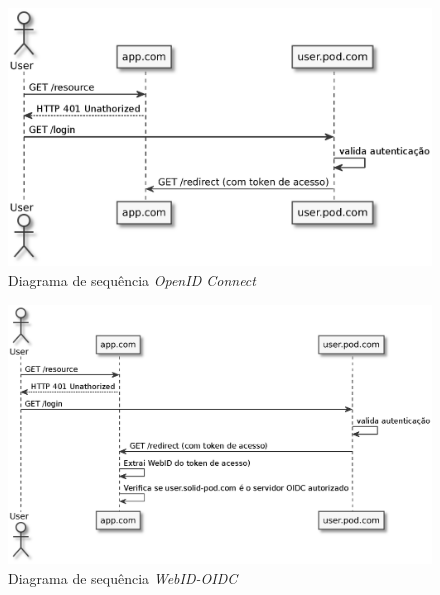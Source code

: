 \begin{figure}[H]
    \centering
    \includegraphics[width=0.9 \textwidth]{figures/open_id_connect_sd.eps}
    \caption{Diagrama de sequência \emph{OpenID Connect}}
    \label{open-id-connect-sequence-diagram}
\end{figure}

\begin{figure}[H]
    \centering
    \includegraphics[width=0.9 \textwidth]{figures/WebId-OIDC}
    \caption{Diagrama de sequência \emph{WebID-OIDC}}
    \label{web-id-oidc-sequence-diagram}
\end{figure}

